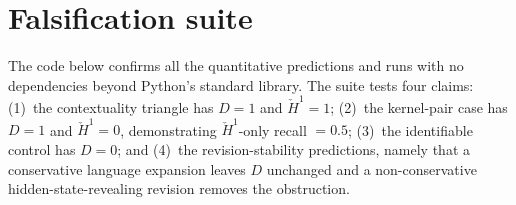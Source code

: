 \documentclass[11pt]{article}
\begin{document}



\appendix

\clearpage
\section{Falsification suite}
\label{app:suite}

The code below confirms all the quantitative predictions and runs with no
dependencies beyond Python's standard library.
The suite tests four claims: (1)~the contextuality triangle has $D = 1$ and
$\check{H}^1 = 1$;
(2)~the kernel-pair case has $D = 1$ and $\check{H}^1 = 0$, demonstrating
$\check{H}^1$-only recall $= 0.5$; (3)~the identifiable control has $D = 0$;
and (4)~the revision-stability predictions, namely that a conservative
language expansion leaves $D$ unchanged and a non-conservative
hidden-state-revealing revision removes the obstruction.
\end{document}
